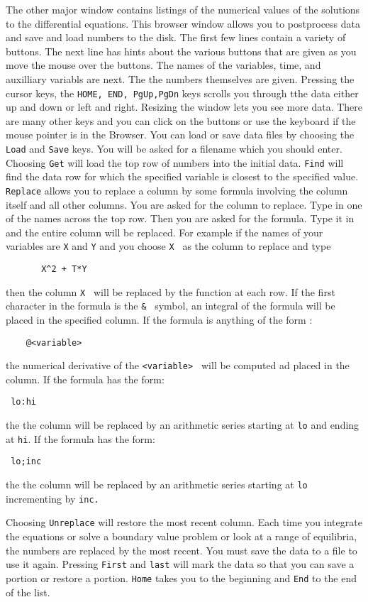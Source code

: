 \documentclass{article}
\newcommand{\bvb}{\begin{verbatim}}
\begin{document}
The other major window contains listings of the numerical values of the solutions 
to the differential equations. 
 This browser window allows you to postprocess
 data and save and load numbers to the disk.
The first few lines contain a variety
of buttons.  The next line has hints about the various buttons that
are given as you move the mouse over the buttons. The names of the
variables, time, and auxilliary variabls are next.  The the numbers
themselves are given. 
  Pressing the cursor keys, the
 {\tt HOME, END, PgUp,PgDn}  keys scrolls you through tthe data either up and down or
 left and right.  Resizing the window lets you see more data.  There are many
 other keys and you can click on the buttons or use the keyboard if the mouse
 pointer is in the Browser.  You can load or save data files by choosing the 
{\tt Load}  and {\tt Save}  keys.  You will be asked for a filename which you should enter.
  Choosing {\tt Get} will load the top row of numbers into the initial data.
 {\tt Find} will find the data row for which the specified variable is closest to
 the specified value.   {\tt Replace} allows you to replace a column by some formula 
involving the column itself and all other columns.  You are asked for the column 
to replace.  Type in one of the names across the top row.  Then you are asked 
for the formula.  Type it in and the entire column will be replaced.  For example 
if the names of your variables are {\tt X}  and { \tt Y}  and you
choose {\tt X } as the column
 to replace and type 
\bvb 
       X^2 + T*Y
\end{verbatim}
then the column {\tt X } will be replaced by the function at each row.  If the first 
character in the formula is the {\tt \& } symbol, an integral of the formula will be
 placed in the specified column.  If the formula is anything of the form :
\bvb
	@<variable>
\end{verbatim}
the numerical derivative of the {\tt <variable> } will be computed ad placed in the
 column. 
If the formula has the form:
\bvb
 lo:hi
\end{verbatim}
the the column will be replaced by an arithmetic series starting at
{\tt lo} and ending at {\tt hi}.
If the formula has the form:
\bvb
 lo;inc
\end{verbatim}
the the column will be replaced by an arithmetic series starting at
{\tt lo} incrementing by {\tt inc.} 

Choosing {\tt Unreplace} will restore the most recent column.  Each time you integrate
 the equations or solve a boundary value problem or look at a range of equilibria, 
the numbers are replaced by the most recent.  You must save the data to a
 file to use it again.  Pressing {\tt First}  and {\tt last} will mark the data so that you 
can save a portion or restore a portion.  {\tt Home} takes you to the beginning and
 {\tt End} to the end of the list. 
\end{document}
